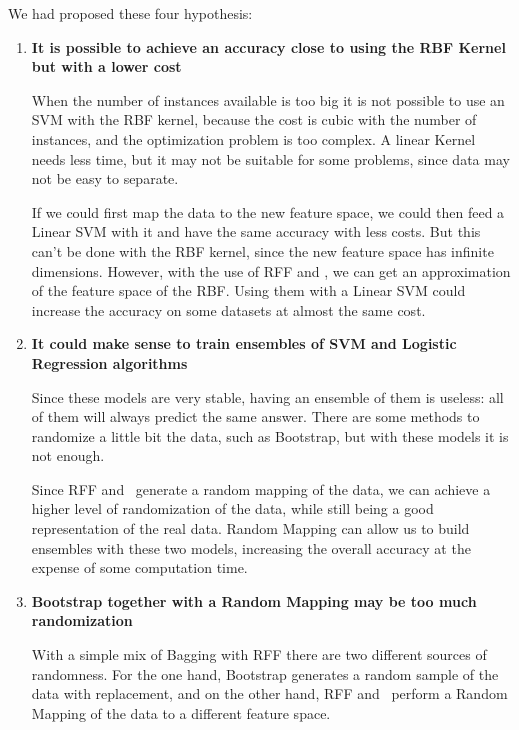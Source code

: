 \begin{pre-delivery}
  We had proposed these four hypothesis:
  \begin{enumerate}
    \item \textbf{It is possible to achieve an accuracy close to using the
    RBF Kernel but with a lower cost}

    When the number of instances available is too big it is not possible to
    use an SVM with the RBF kernel, because the cost is cubic with the
    number of instances, and the optimization problem is too complex. A linear
    Kernel needs less time, but it may not be suitable for some problems,
    since data may not be easy to separate.

    If we could first map the data to the new feature space, we could then feed
    a Linear SVM with it and have the same accuracy with less costs. But this
    can't be done with the RBF kernel, since the new feature space has infinite
    dimensions. However, with the use of RFF and \Nys, we can get an approximation
    of the feature space of the RBF. Using them with a Linear SVM could
    increase the accuracy on some datasets at almost the same cost.

    \item \textbf{It could make sense to train ensembles of SVM and Logistic
    Regression algorithms}

    Since these models are very stable, having an ensemble of them is useless:
    all of them will always predict the same answer. There are some
    methods to randomize a little bit the data, such as Bootstrap, but with
    these models it is not enough.

    Since RFF and \Nys\ generate a random mapping of the data, we can achieve
    a higher level of randomization of the data, while still being a good
    representation of the real data. Random Mapping can allow us to build
    ensembles with these two models, increasing the overall accuracy at the
    expense of some computation time.

    \item \textbf{Bootstrap together with a Random Mapping may be too much
    randomization}

    With a simple mix of Bagging with RFF there are two different sources
    of randomness. For the one hand, Bootstrap generates a random sample of
    the data with replacement, and on the other hand, RFF and \Nys\ perform
    a Random Mapping of the data to a different feature space.


\end{enumerate}
\end{pre-delivery}
